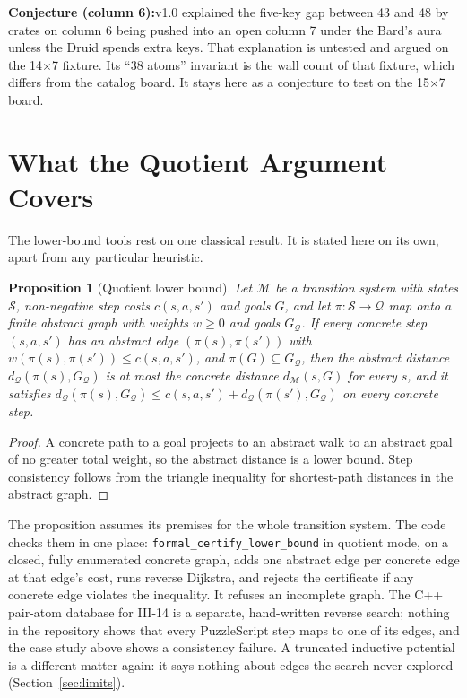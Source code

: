 \documentclass[11pt,a4paper]{article}
\newtheorem{proposition}{Proposition}
\newcommand{\takeaway}[2]{%
  \vspace{4pt}\noindent\colorbox{slatebg}{%
    \parbox{\dimexpr\linewidth-2\fboxsep\relax}{%
      \vspace{3pt}\textbf{\color{primary}#1:}\hspace{0.5em}#2\vspace{3pt}%
    }%
  }\vspace{4pt}%
}
\begin{document}
\takeaway{Conjecture (column 6)}{v1.0 explained the five-key gap between 43 and 48 by crates on column 6 being pushed into an open column 7 under the Bard's aura unless the Druid spends extra keys. That explanation is untested and argued on the 14$\times$7 fixture. Its ``38 atoms'' invariant is the wall count of that fixture, which differs from the catalog board. It stays here as a conjecture to test on the 15$\times$7 board.}

\section{What the Quotient Argument Covers}
\label{sec:prop}

The lower-bound tools rest on one classical result. It is stated here on its own, apart from any particular heuristic.

\begin{proposition}[Quotient lower bound]
\label{prop:quotient}
Let $\mathcal{M}$ be a transition system with states $\mathcal{S}$, non-negative step costs $c(s,a,s')$ and goals $G$, and let $\pi:\mathcal{S}\to\mathcal{Q}$ map onto a finite abstract graph with weights $w\ge 0$ and goals $G_{\mathcal{Q}}$. If every concrete step $(s,a,s')$ has an abstract edge $(\pi(s),\pi(s'))$ with $w(\pi(s),\pi(s'))\le c(s,a,s')$, and $\pi(G)\subseteq G_{\mathcal{Q}}$, then the abstract distance $d_{\mathcal{Q}}(\pi(s),G_{\mathcal{Q}})$ is at most the concrete distance $d_{\mathcal{M}}(s,G)$ for every $s$, and it satisfies $d_{\mathcal{Q}}(\pi(s),G_{\mathcal{Q}})\le c(s,a,s')+d_{\mathcal{Q}}(\pi(s'),G_{\mathcal{Q}})$ on every concrete step.
\end{proposition}
\begin{proof}
A concrete path to a goal projects to an abstract walk to an abstract goal of no greater total weight, so the abstract distance is a lower bound. Step consistency follows from the triangle inequality for shortest-path distances in the abstract graph.
\end{proof}

The proposition assumes its premises for the whole transition system. The code checks them in one place: \texttt{formal\_\allowbreak certify\_\allowbreak lower\_\allowbreak bound} in quotient mode, on a closed, fully enumerated concrete graph, adds one abstract edge per concrete edge at that edge's cost, runs reverse Dijkstra, and rejects the certificate if any concrete edge violates the inequality. It refuses an incomplete graph. The C++ pair-atom database for III-14 is a separate, hand-written reverse search; nothing in the repository shows that every PuzzleScript step maps to one of its edges, and the case study above shows a consistency failure. A truncated inductive potential is a different matter again: it says nothing about edges the search never explored (Section~\ref{sec:limits}).
\end{document}
